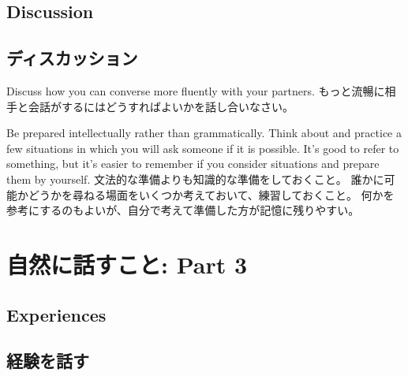 \documentclass[uplatex,dvipdfmx,b5paper,english,10pt]{jsbook}
\newif\ifNATURALSPEAKINGPARTTHREE
\begin{document}
\ifEnglish
\section{Discussion}
\else
\section{ディスカッション}
\fi

\begin{toiquestion}
\ifEnglish
Discuss how you can converse more fluently with your partners.
\else
もっと流暢に相手と会話がするにはどうすればよいかを話し合いなさい。
\fi
\end{toiquestion}
\begin{toianswer}
\ifEnglish
Be prepared intellectually rather than grammatically.
Think about and practice a few situations in which you will ask someone if it is possible.
It's good to refer to something, but it's easier to remember if you consider situations and prepare them by yourself.
\else
文法的な準備よりも知識的な準備をしておくこと。
誰かに可能かどうかを尋ねる場面をいくつか考えておいて、練習しておくこと。
何かを参考にするのもよいが、自分で考えて準備した方が記憶に残りやすい。
\fi
\end{toianswer}


%

\fi%


\ifNATURALSPEAKINGPARTTHREE
\ifEnglish
\chapter{Natural Speaking: Part 3} %
\else
\chapter{自然に話すこと: Part 3}
\fi

\ifEnglish
  \section{Experiences}
\else
  \section{経験を話す}
\fi

\end{document}
